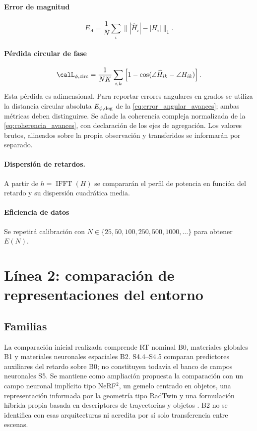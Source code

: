 \paragraph{Error de magnitud}
\begin{equation}
E_A=\frac{1}{N}\sum_i
\big\||\widehat H_i|-|H_i|\big\|_1.
\end{equation}

\paragraph{Pérdida circular de fase}
\begin{equation}
\calL_{\phi,\rm circ}=\frac{1}{NK}
\sum_{i,k}\left[1-
\cos(\angle\widehat H_{ik}-\angle H_{ik})\right].
\end{equation}
Esta pérdida es adimensional. Para reportar errores angulares en grados se utiliza la distancia circular absoluta $E_{\phi,\rm deg}$ de la \cref{eq:error_angular_avances}; ambas métricas deben distinguirse. Se añade la coherencia compleja normalizada de la \cref{eq:coherencia_avances}, con declaración de los ejes de agregación. Los valores brutos, alineados sobre la propia observación y transferidos se informarán por separado.

\paragraph{Dispersión de retardos.}
A partir de $h=\operatorname{IFFT}(H)$ se compararán el perfil de potencia en función del retardo y su dispersión cuadrática media.

\paragraph{Eficiencia de datos}
Se repetirá calibración con $N\in\{25,50,100,250,500,1000,\ldots\}$ para obtener $E(N)$.

\section{Línea 2: comparación de representaciones del entorno}

\subsection{Familias}

La comparación inicial realizada comprende RT nominal B0, materiales globales B1 y materiales neuronales espaciales B2. S4.4--S4.5 comparan predictores auxiliares del retardo sobre B0; no constituyen todavía el banco de campos neuronales S5. Se mantiene como ampliación propuesta la comparación con un campo neuronal implícito tipo NeRF$^2$, un gemelo centrado en objetos, una representación informada por la geometría tipo RadTwin y una formulación híbrida propia basada en descriptores de trayectorias y objetos \citep{Zhao2023NeRF2,Jiang2025LearnableWDT,Zhang2026RadTwin}. B2 no se identifica con esas arquitecturas ni acredita por sí solo transferencia entre escenas.

